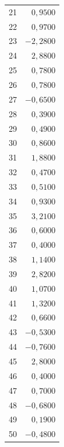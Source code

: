 \documentclass[a4paper, 11pt]{article}
\begin{document}
\begin{table}[H]
\begin{tabular}[t]{r|r|}
			21 & $ 0,9500 $ \\ \cline{2-2}
			22 & $ 0,9700 $ \\ \cline{2-2}
			23 & $ -2,2800 $ \\ \cline{2-2}
			24 & $ 2,8800 $ \\ \cline{2-2}
			25 & $ 0,7800 $ \\ \cline{2-2}
			26 & $ 0,7800 $ \\ \cline{2-2}
			27 & $ -0,6500 $ \\ \cline{2-2}
			28 & $ 0,3900 $ \\ \cline{2-2}
			29 & $ 0,4900 $ \\ \cline{2-2}
			30 & $ 0,8600 $ \\ \cline{2-2}
			31 & $ 1,8800 $ \\ \cline{2-2}
			32 & $ 0,4700 $ \\ \cline{2-2}
			33 & $ 0,5100 $ \\ \cline{2-2}
			34 & $ 0,9300 $ \\ \cline{2-2}
			35 & $ 3,2100 $ \\ \cline{2-2}
			36 & $ 0,6000 $ \\ \cline{2-2}
			37 & $ 0,4000 $ \\ \cline{2-2}
			38 & $ 1,1400 $ \\ \cline{2-2}
			39 & $ 2,8200 $ \\ \cline{2-2}
			40 & $ 1,0700 $ \\ \cline{2-2}
			41 & $ 1,3200 $ \\ \cline{2-2}
			42 & $ 0,6600 $ \\ \cline{2-2}
			43 & $ -0,5300 $ \\ \cline{2-2}
			44 & $ -0,7600 $ \\ \cline{2-2}
			45 & $ 2,8000 $ \\ \cline{2-2}
			46 & $ 0,4000 $ \\ \cline{2-2}
			47 & $ 0,7000 $ \\ \cline{2-2}
			48 & $ -0,6800 $ \\ \cline{2-2}
			49 & $ 0,1900 $ \\ \cline{2-2}
			50 & $ -0,4800 $ \\ \cline{2-2}
		\end{tabular}
	\end{table}
\end{document}
